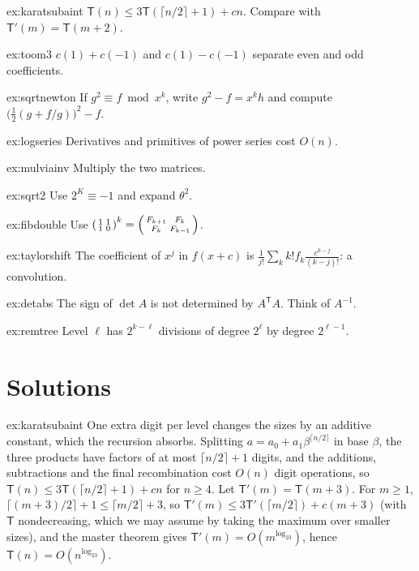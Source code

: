 \begin{hint}{ex:karatsubaint}
$\mathsf T(n)\le3\mathsf T(\lceil n/2\rceil+1)+cn$. Compare with $\mathsf T'(m)=\mathsf T(m+2)$.
\end{hint}
\begin{hint}{ex:toom3}
$c(1)+c(-1)$ and $c(1)-c(-1)$ separate even and odd coefficients.
\end{hint}
\begin{hint}{ex:sqrtnewton}
If $g^2\equiv f\bmod x^k$, write $g^2-f=x^kh$ and compute $\bigl(\frac12(g+f/g)\bigr)^2-f$.
\end{hint}
\begin{hint}{ex:logseries}
Derivatives and primitives of power series cost $O(n)$.
\end{hint}
\begin{hint}{ex:mulviainv}
Multiply the two matrices.
\end{hint}
\begin{hint}{ex:sqrt2}
Use $2^K\equiv-1$ and expand $\theta^2$.
\end{hint}
\begin{hint}{ex:fibdouble}
Use $\begin{psmallmatrix}1&1\\1&0\end{psmallmatrix}^k=\begin{psmallmatrix}F_{k+1}&F_k\\F_k&F_{k-1}\end{psmallmatrix}$.
\end{hint}
\begin{hint}{ex:taylorshift}
The coefficient of $x^j$ in $f(x+c)$ is $\frac1{j!}\sum_kk!f_k\frac{c^{k-j}}{(k-j)!}$: a convolution.
\end{hint}
\begin{hint}{ex:detabs}
The sign of $\det A$ is not determined by $A^{\mathsf T}A$. Think of $A^{-1}$.
\end{hint}
\begin{hint}{ex:remtree}
Level $\ell$ has $2^{k-\ell}$ divisions of degree $2^{\ell}$ by degree $2^{\ell-1}$.
\end{hint}

\section{Solutions}

\begin{solution}{ex:karatsubaint}
\idea One extra digit per level changes the sizes by an additive constant, which the recursion absorbs.
\writeup Splitting $a=a_0+a_1\beta^{\lceil n/2\rceil}$ in base $\beta$, the three products have factors of at most $\lceil n/2\rceil+1$ digits, and the additions, subtractions and the final recombination cost $O(n)$ digit operations, so $\mathsf T(n)\le3\mathsf T(\lceil n/2\rceil+1)+cn$ for $n\ge4$. Let $\mathsf T'(m)=\mathsf T(m+3)$. For $m\ge1$,
$\lceil(m+3)/2\rceil+1\le\lceil m/2\rceil+3$, so $\mathsf T'(m)\le3\mathsf T'(\lceil m/2\rceil)+c(m+3)$ (with $\mathsf T$ nondecreasing, which we may assume by taking the maximum over smaller sizes), and the master theorem gives $\mathsf T'(m)=O(m^{\log_23})$, hence $\mathsf T(n)=O(n^{\log_23})$.
\end{solution}

